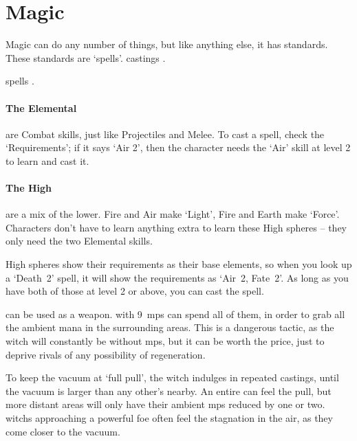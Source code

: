 \chapter[Chamber of Magic]{Magic}
\label{spellsChapter}
\toggletrue{examplecharacter}

\begin{multicols}{2}

\noindent
Magic can do any number of things, but like anything else, it has standards.
These standards are `spells'.
\Glspl{casting}
.

\Glspl{spell}
.

\subsubsection{The Elemental }
are Combat \glspl{skill}, just like Projectiles and Melee.
To cast a spell, check the `Requirements'; if it says `Air 2', then the character needs the `Air' \gls{skill} at level 2 to learn and cast it.

\subsubsection{The High }
are a mix of the lower.
Fire and Air make `Light', Fire and Earth make `Force'.
Characters don't have to learn anything extra to learn these High \glspl{sphere} -- they only need the two Elemental \glspl{skill}.

High \glspl{sphere} show their requirements as their base elements, so when you look up a `Death~2' spell, it will show the requirements as `Air~2, Fate~2'.
As long as you have both of those at level 2 or above, you can cast the spell.

can be used as a weapon.
 with 9~\glspl{mp} can spend all of them, in order to grab all the ambient mana in the surrounding \glspl{area}.
This is a dangerous tactic, as the \gls{witch} will constantly be without \glspl{mp}, but it can be worth the price, just to deprive rivals of any possibility of regeneration.

To keep the vacuum at `full pull', the \gls{witch} indulges in repeated \glspl{casting}, until the vacuum is larger than any other's nearby.
An entire  can feel the pull, but more distant \glspl{area} will only have their ambient \glspl{mp} reduced by one or two.
\Glspl{witch} approaching a powerful foe often feel the stagnation in the air, as they come closer to the vacuum.

\end{multicols}

